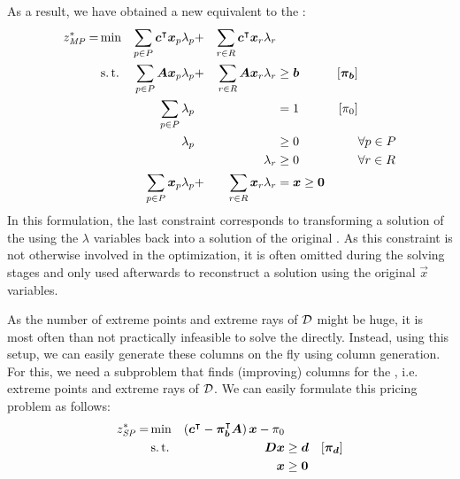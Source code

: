 As a result, we have obtained a new \MP{} equivalent to the \LP{}:
\begin{equation}
\begin{aligned}
z^*_{\textit{MP}}{} = &\min & \sum_{p \in P} {\bm{c}}^\intercal {\bm{x}}_p \lambda_p &+ &\sum_{r \in R} {\bm{c}}^\intercal {\bm{x}}_r \lambda_r & & & \\
&\operatorname{s.t.} & \sum_{p \in P} {\bm{A}} {\bm{x}}_p \lambda_p &+ &\sum_{r \in R} {\bm{A}} {\bm{x}}_r \lambda_r & \geq {\bm{b}} & \left[{\bm{\pi}}_{\bm{b}}\right] \\
&& \sum_{p \in P} \lambda_p & & & = 1 & \left[\pi_0 \right] & \\
&& \lambda_p & & & \geq 0 & & \forall p \in P \\
&& & & \lambda_r & \geq 0 & & \forall r \in R \\
&& \sum_{p \in P} {\bm{x}}_p \lambda_p &+ &\sum_{r \in R} {\bm{x}}_r \lambda_r & = {\bm{x}} \geq {\bm{0}} & &
\end{aligned}
\end{equation}
In this formulation, the last constraint corresponds to transforming a solution of the \MP{} using the $\lambda$ variables back into a solution of the original \LP{}. As this constraint is not otherwise involved in the optimization, it is often omitted during the solving stages and only used afterwards to reconstruct a solution using the original $\vec{x}$ variables.

As the number of extreme points and extreme rays of $\mathcal{D}$ might be huge, it is most often than not practically infeasible to solve the \MP{} directly. Instead, using this setup, we can easily generate these columns on the fly using column generation. For this, we need a subproblem that finds (improving) columns for the \MP{}, i.e. extreme points and extreme rays of $\mathcal{D}$. We can easily formulate this pricing problem as follows:
\begin{equation}
\begin{aligned}
z^*_\SP{} = &\min & \left( \vec{c}\transpose - \vec{\pi}_\vec{b}\transpose \mat{A} \right) \vec{x} - \pi_0 & & \\
&\st & \mat{D} \vec{x} & \geq \vec{d} & \left[\vec{\pi}_\vec{d}\right] \\
&& \vec{x} & \geq \vec{0}
\end{aligned}
\end{equation}

